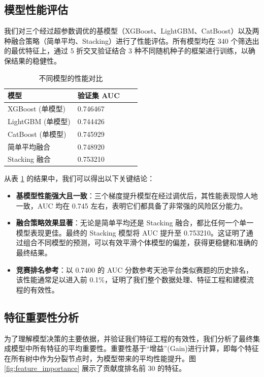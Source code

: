 \documentclass{thuemp}
\begin{document}
\subsection{模型性能评估}

我们对三个经过超参数调优的基模型（XGBoost、LightGBM、CatBoost）以及两种融合策略（简单平均、Stacking）进行了性能评估。所有模型均在 340 个筛选出的最优特征上，通过 5 折交叉验证结合 3 种不同随机种子的框架进行训练，以确保结果的稳健性。

\begin{table}[H]
\centering
\caption{不同模型的性能对比}
\label{tab:model_performance}
\begin{tabularx}{0.8\textwidth}{|l|X|X|X|}
\hline
模型 & 验证集 AUC  \\ \hline
XGBoost (单模型) & 0.746467  \\ \hline
LightGBM (单模型) & 0.744426  \\ \hline
CatBoost (单模型) & 0.745929 \\ \hline
简单平均融合 & 0.748920 \\ \hline
Stacking 融合 & 0.753210 \\ \hline
\end{tabularx}
\end{table}

从表 \ref{tab:model_performance} 的结果中，我们可以得出以下关键结论：

\begin{itemize}
    \item \textbf{基模型性能强大且一致}：三个梯度提升模型在经过调优后，其性能表现惊人地一致，AUC 均在 0.745 左右，表明它们都具备了非常强的风险区分能力。
    \item \textbf{融合策略效果显著}：无论是简单平均还是 Stacking 融合，都比任何一个单一模型表现更佳。最终的 Stacking 模型将 AUC 提升至 0.753210。这证明了通过组合不同模型的预测，可以有效平滑个体模型的偏差，获得更稳健和准确的最终结果。
    \item \textbf{竞赛排名参考}：以 0.7400 的 AUC 分数参考天池平台类似赛题的历史排名，该性能通常足以进入前 0.1\%，证明了我们整个数据处理、特征工程和建模流程的有效性。
\end{itemize}

\subsection{特征重要性分析}

为了理解模型决策的主要依据，并验证我们特征工程的有效性，我们分析了最终集成模型中所有特征的平均重要性。重要性基于“增益”(Gain)进行计算，即每个特征在所有树中作为分裂节点时，为模型带来的平均性能提升。图 \ref{fig:feature_importance} 展示了贡献度排名前 30 的特征。
\end{document}
